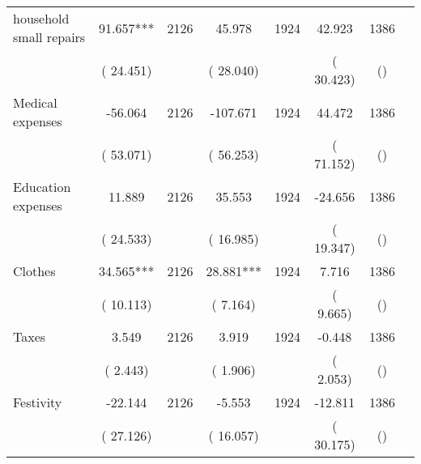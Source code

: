\begin{tabular}{l*{6}{c}}
household small repairs        &             91.657***      &       2126       &             45.978      &       1924       &             42.923      &       1386  &  &              \\
                       &       (      24.451)            &                               &       (      28.040)            &                               &       (      30.423)            &       () &                  \\
Medical expenses        &            -56.064      &       2126       &           -107.671      &       1924       &             44.472      &       1386  &  &              \\
                       &       (      53.071)            &                               &       (      56.253)            &                               &       (      71.152)            &       () &                  \\
Education expenses        &             11.889      &       2126       &             35.553      &       1924       &            -24.656      &       1386  &  &              \\
                       &       (      24.533)            &                               &       (      16.985)            &                               &       (      19.347)            &       () &                  \\
Clothes        &             34.565***      &       2126       &             28.881***      &       1924       &              7.716      &       1386  &  &              \\
                       &       (      10.113)            &                               &       (       7.164)            &                               &       (       9.665)            &       () &                  \\
Taxes        &              3.549      &       2126       &              3.919      &       1924       &             -0.448      &       1386  &  &              \\
                       &       (       2.443)            &                               &       (       1.906)            &                               &       (       2.053)            &       () &                  \\
Festivity        &            -22.144      &       2126       &             -5.553      &       1924       &            -12.811      &       1386  &  &              \\
                       &       (      27.126)            &                               &       (      16.057)            &                               &       (      30.175)            &       () &                  \\
\hline \end{tabular}